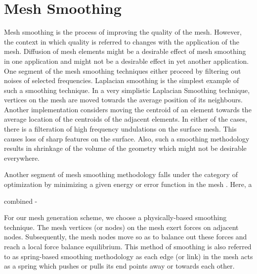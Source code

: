 \section{Mesh Smoothing}

Mesh smoothing is the process of improving the quality of the mesh. However, the context in which quality is referred to changes with the application of the mesh. Diffusion of mesh elements might be a desirable effect of mesh smoothing in one application and might not be a desirable effect in yet another application. One segment of the mesh smoothing techniques either proceed by filtering out noises of selected frequencies. Laplacian smoothing is the simplest example of such a smoothing technique. In a very simplistic Laplacian Smoothing technique, vertices on the mesh are moved towards the average position of its neighbours. Another implementation considers moving the centroid of an element towards the average location of the centroids of the adjacent elements. In either of the cases, there is a filteration of high frequency undulations on the surface mesh. This causes loss of sharp features on the surface. Also, such a smoothing methodology results in shrinkage of the volume of the geometry which might not be desirable everywhere.

Another segment of mesh smoothing methodology falls under the category of optimization by minimizing a given energy or error function in the mesh \cite{freitag1997tetrahedral, zhou2000angle, chen2004mesh, parthasarathy1991constrained, shephard1991automatic}. Here, a 

combined - \cite{freitag1997combining, canann1998approach}

For our mesh generation scheme, we choose a physically-based smoothing technique. The mesh vertices (or nodes) on the mesh exert forces on adjacent nodes. Subsequently, the mesh nodes move so as to balance out these forces and reach a local force balance equilibrium. This method of smoothing is also referred to as spring-based smoothing methodology as each edge (or link) in the mesh acts as a spring which pushes or pulls its end points away or towards each other.

